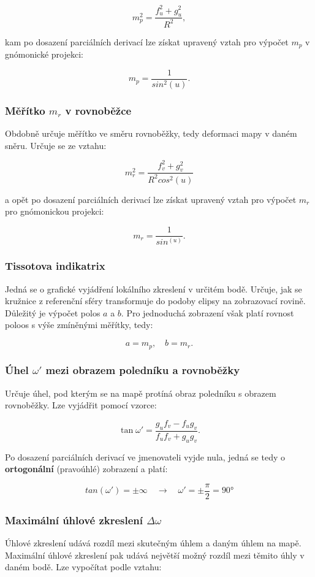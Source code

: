 \documentclass[12pt, a4paper]{article}
\begin{document}
$$m_{p}^{2} = \frac{f_{u}^{2} + g_{u}^{2}}{R^{2}},$$

kam po dosazení parciálních derivací lze získat upravený vztah pro výpočet $m_p$ v gnómonické projekci:

$$m_p = \frac{1}{sin^2(u)}.$$
\subsubsection{Měřítko $m_r$ v rovnoběžce}
Obdobně určuje měřítko ve směru rovnoběžky, tedy deformaci mapy v daném sněru. Určuje se ze vztahu: 

$$m_{r}^{2} = \frac{f_{v}^{2} + g_{v}^{2}}{R^{2}cos^2(u)}$$

a opět po dosazení parciálních derivací lze získat upravený vztah pro výpočet $m_r$ pro gnómonickou projekci:

$$m_r = \frac{1}{sin^(u)}.$$

\subsubsection{Tissotova indikatrix}
Jedná se o grafické vyjádření lokálního zkreslení v určitém bodě. Určuje, jak se kružnice z referenční sféry transformuje do podoby elipsy na zobrazovací rovině. Důležitý je výpočet polos $a$ a $b$. Pro jednoduchá zobrazení však platí rovnost poloos s výše zmíněnými měřítky, tedy:

$$a = m_p, \quad b = m_r.$$

\subsubsection{Úhel $\omega'$ mezi obrazem poledníku a rovnoběžky}
Určuje úhel, pod kterým se na mapě protíná obraz poledníku s obrazem rovnoběžky. Lze vyjádřit pomocí vzorce:

$$\tan \omega' = \frac{g_u  f_v - f_u  g_v}{f_u  f_v + g_u  g_v}.$$

Po dosazení parciálních derivací ve jmenovateli vyjde nula, jedná se tedy o \textbf{ortogonální} (pravoúhlé) zobrazení a platí:

$$tan(\omega') = \pm \infty \quad \to \quad \omega' = \pm \frac{\pi}{2} = 90°$$

\subsubsection{Maximální úhlové zkreslení $\Delta\omega$}
Úhlové zkreslení udává rozdíl mezi skutečným úhlem a daným úhlem na mapě. Maximální úhlové zkreslení pak udává největší možný rozdíl mezi těmito úhly v daném bodě. Lze vypočítat podle vztahu:
\end{document}
